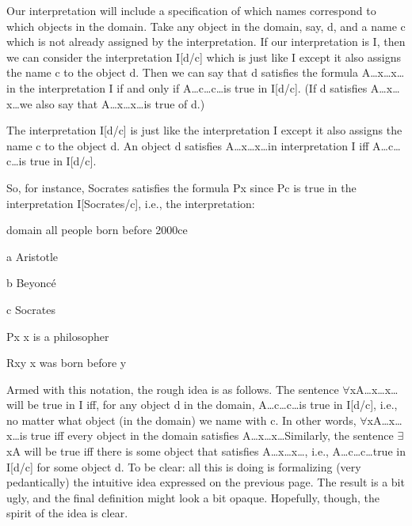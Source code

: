 Our interpretation will include a specification of which names correspond to which objects in the domain. Take any object in the domain, say, d, and a name c which is not already assigned by the interpretation. If our interpretation is I, then we can consider the interpretation I[d/c] which is just like I except it also assigns the name c to the object d. Then we can say that d satisfies the formula A\ldots x\ldots x\ldots  in the interpretation I if and only if A\ldots c\ldots c\ldots  is true in I[d/c]. (If d satisfies A\ldots x\ldots x\ldots  we also say that A\ldots x\ldots x\ldots  is true of d.)

The interpretation I[d/c] is just like the interpretation I except it also assigns the name c to the object d.
An object d satisfies A\ldots x\ldots x\ldots  in interpretation I iff A\ldots c\ldots c\ldots  is true in I[d/c].

So, for instance, Socrates satisfies the formula Px since Pc is true in the interpretation I[Socrates/c], i.e., the interpretation:
\begin{ekey}
\item[domain] all people born before 2000ce
\item[a] Aristotle
\item[b] Beyoncé
\item[c] Socrates
\item[Px] x is a philosopher
\item[Rxy] x was born before y
\end{ekey}
Armed with this notation, the rough idea is as follows. The sentence $\forall$xA\ldots x\ldots x\ldots  will be true in I iff, for any object d in the domain, A\ldots c\ldots c\ldots  is true in I[d/c], i.e., no matter what object (in the domain) we name with c. In other words, $\forall$xA\ldots x\ldots x\ldots  is true iff every object in the domain satisfies A\ldots x\ldots x\ldots  Similarly, the sentence $\exists$xA will be true iff there is some object that satisfies A\ldots x\ldots x\ldots , i.e., A\ldots c\ldots c\ldots  true in I[d/c] for some object d.
To be clear: all this is doing is formalizing (very pedantically) the intuitive idea expressed on the previous page. The result is a bit ugly, and the final definition might look a bit opaque. Hopefully, though, the spirit of the idea is clear.

